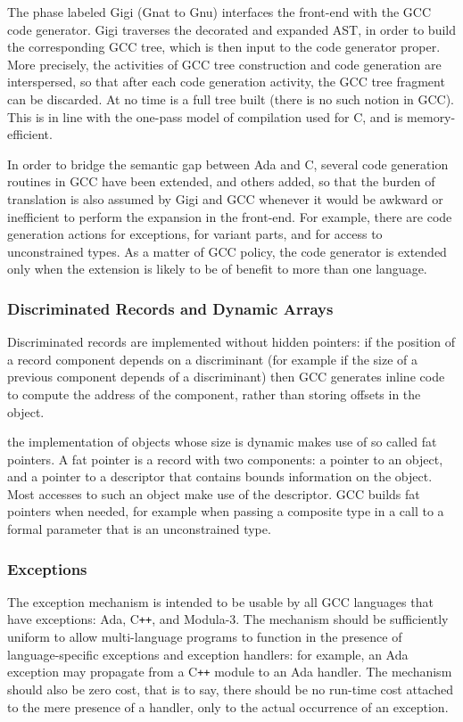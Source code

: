 The phase labeled Gigi (Gnat to Gnu) interfaces the front-end with the
GCC code generator.  Gigi traverses the decorated and expanded AST, in
order to build the corresponding GCC tree, which is then input to the
code generator proper. More precisely, the activities of GCC tree
construction and code generation are interspersed, so that after each
code generation activity, the GCC tree fragment can be discarded.  At
no time is a full tree built (there is no such notion in GCC).  This
is in line with the one-pass model of compilation used for C, and is
memory-efficient.

In order to bridge the semantic gap between Ada and C, several code generation
routines in GCC have been extended, and others added, so that the burden of
translation is also assumed by Gigi and GCC whenever it would be awkward or
inefficient to perform the expansion in the front-end. For example, there are
code generation actions for exceptions, for variant parts, and for access to
unconstrained types. As a matter of GCC policy, the code generator is extended
only when the extension is likely to be of benefit to more than one language.

\subsubsection{Discriminated Records and Dynamic Arrays}

Discriminated records are implemented without hidden pointers: if the position
of a record component depends on a discriminant (for example if the size of
a previous component depends of a discriminant) then GCC generates inline
code to compute the address of the component, rather than storing offsets in
the object.

the implementation of objects whose size is dynamic makes use of so called
fat pointers. A fat pointer is a record with two components: a pointer to
an object, and a pointer to a descriptor that contains bounds information
on the object. Most accesses to such an object make use of the descriptor. 
GCC builds fat pointers when needed, for example when passing a composite 
type in a call to a formal parameter that is an unconstrained type. 

\subsubsection{Exceptions}

The exception mechanism is intended to be usable by all GCC languages
that have exceptions: Ada, C{\tt ++}, and Modula-3. The mechanism
should be sufficiently uniform to allow multi-language programs to
function in the presence of language-specific exceptions and exception
handlers: for example, an Ada exception may propagate from a C{\tt ++}
module to an Ada handler. The mechanism should also be zero cost, that
is to say, there should be no run-time cost attached to the mere
presence of a handler, only to the actual occurrence of an exception.

